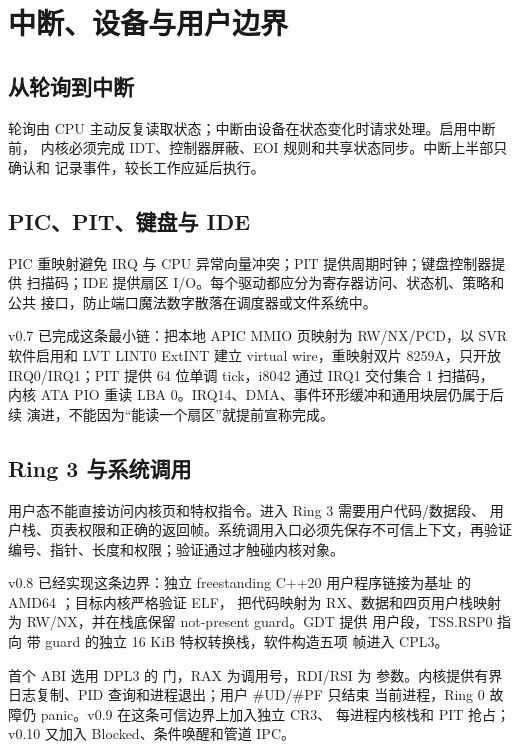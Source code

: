 \section{中断、设备与用户边界}

\subsection{从轮询到中断}

轮询由 CPU 主动反复读取状态；中断由设备在状态变化时请求处理。启用中断前，
内核必须完成 IDT、控制器屏蔽、EOI 规则和共享状态同步。中断上半部只确认和
记录事件，较长工作应延后执行。

\subsection{PIC、PIT、键盘与 IDE}

PIC 重映射避免 IRQ 与 CPU 异常向量冲突；PIT 提供周期时钟；键盘控制器提供
扫描码；IDE 提供扇区 I/O。每个驱动都应分为寄存器访问、状态机、策略和公共
接口，防止端口魔法数字散落在调度器或文件系统中。

v0.7 已完成这条最小链：把本地 APIC MMIO 页映射为 RW/NX/PCD，以 SVR
软件启用和 LVT LINT0 ExtINT 建立 virtual wire，重映射双片 8259A，只开放
IRQ0/IRQ1；PIT 提供 64 位单调 tick，i8042 通过 IRQ1 交付集合 1 扫描码，
内核 ATA PIO 重读 LBA 0。IRQ14、DMA、事件环形缓冲和通用块层仍属于后续
演进，不能因为“能读一个扇区”就提前宣称完成。

\subsection{Ring 3 与系统调用}

用户态不能直接访问内核页和特权指令。进入 Ring 3 需要用户代码/数据段、
用户栈、页表权限和正确的返回帧。系统调用入口必须先保存不可信上下文，再验证
编号、指针、长度和权限；验证通过才触碰内核对象。

v0.8 已经实现这条边界：独立 freestanding C++20 用户程序链接为基址
 的 AMD64 ；目标内核严格验证 ELF，
把代码映射为 RX、数据和四页用户栈映射为 RW/NX，并在栈底保留
not-present guard。GDT 提供  用户段，TSS.RSP0 指向
带 guard 的独立 16 KiB 特权转换栈，软件构造五项  帧进入
CPL3。

首个 ABI 选用 DPL3 的  门，RAX 为调用号，RDI/RSI 为
参数。内核提供有界日志复制、PID 查询和进程退出；用户 \#UD/\#PF 只结束
当前进程，Ring 0 故障仍 panic。v0.9 在这条可信边界上加入独立 CR3、
每进程内核栈和 PIT 抢占；v0.10 又加入 Blocked、条件唤醒和管道 IPC。

